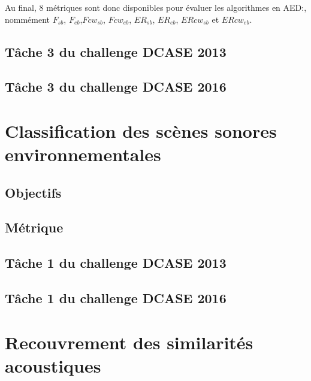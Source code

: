 Au final, 8 métriques sont donc disponibles pour évaluer les algorithmes en AED:, nommément $F_{sb}$, $F_{eb}$,$Fcw_{sb}$, $Fcw_{eb}$, $ER_{sb}$, $ER_{eb}$, $ERcw_{sb}$ et $ERcw_{eb}$.

\subsection{Tâche 3 du challenge DCASE 2013}
\label{sec:ch6_dcase2013AED}

\citep{Giannoulis2013database, giannoulis2013detection, Stowell15}

\subsection{Tâche 3 du challenge DCASE 2016}
\label{sec:ch6_dcase2016AED}

\section{Classification des scènes sonores environnementales}
\label{sec:ch6_ASC}

\subsection{Objectifs}
\label{sec:ch6_objASC}


\subsection{Métrique}
\label{sec:ch6_metriqueASC}

\subsection{Tâche 1 du challenge DCASE 2013}
\label{sec:ch6_dcase2013ASC}

\subsection{Tâche 1 du challenge DCASE 2016}
\label{sec:ch6_dcase2016ASC}

\section{Recouvrement des similarités acoustiques}
\label{sec:ch6_ASSR}

